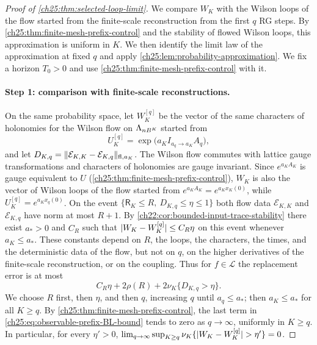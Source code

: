 \begin{proof}[Proof of \cref{ch25:thm:selected-loop-limit}]
We compare $W_K$ with the Wilson loops of the flow started from the finite-scale reconstruction from the first $q$ RG steps. By \cref{ch25:thm:finite-mesh-prefix-control} and the stability of flowed Wilson loops, this approximation is uniform in $K$. We then identify the limit law of the approximation at fixed $q$ and apply \cref{ch25:lem:probability-approximation}. We fix a horizon $T_0>0$ and use \cref{ch25:thm:finite-mesh-prefix-control} with it.

\paragraph{Step 1: comparison with finite-scale reconstructions.}
On the same probability space, let $W_K^{[q]}$ be the vector of the same characters of holonomies for the Wilson flow on $\Lambda_{nB^K}$ started from
\[
 U_K^{[q]}=\exp\bigl(a_KI_{a_q\to a_K}A_q\bigr),
\]
and let $D_{K,q}=\lVert \mathcal E_{K,K}-\mathcal E_{K,q}\rVert_{\mathrm{fl},a_K}$. The Wilson flow commutes with lattice gauge transformations and characters of holonomies are gauge invariant. Since $e^{a_KA_K}$ is gauge equivalent to $U$ (\cref{ch25:thm:finite-mesh-prefix-control}), $W_K$ is also the vector of Wilson loops of the flow started from $e^{a_KA_K}=e^{a_Kx_K(0)}$, while $U_K^{[q]}=e^{a_Kx_q(0)}$. On the event $\{\mathsf R_K\le R,\ D_{K,q}\le\eta\le1\}$ both flow data $\mathcal E_{K,K}$ and $\mathcal E_{K,q}$ have norm at most $R+1$. By \cref{ch22:cor:bounded-input-trace-stability} there exist $a_*>0$ and $C_R$ such that $\lvert W_K-W_K^{[q]}\rvert\le C_R\eta$ on this event whenever $a_K\le a_*$. These constants depend on $R$, the loops, the characters, the times, and the deterministic data of the flow, but not on $q$, on the higher derivatives of the finite-scale reconstruction, or on the coupling. Thus for $f\in\mathscr L$ the replacement error is at most
\begin{equation}\label{ch25:eq:observable-prefix-BL-bound}
 C_R\eta+2\rho(R)+2\nu_K\{D_{K,q}>\eta\}.
\end{equation}
We choose $R$ first, then $\eta$, and then $q$, increasing $q$ until $a_q\le a_*$; then $a_K\le a_*$ for all $K\ge q$. By \cref{ch25:thm:finite-mesh-prefix-control}, the last term in \eqref{ch25:eq:observable-prefix-BL-bound} tends to zero as $q\to\infty$, uniformly in $K\ge q$. In particular, for every $\eta'>0$, $\lim_{q\to\infty}\sup_{K\ge q}\nu_K\{\lvert W_K-W_K^{[q]}\rvert>\eta'\}=0$.


\end{proof}
